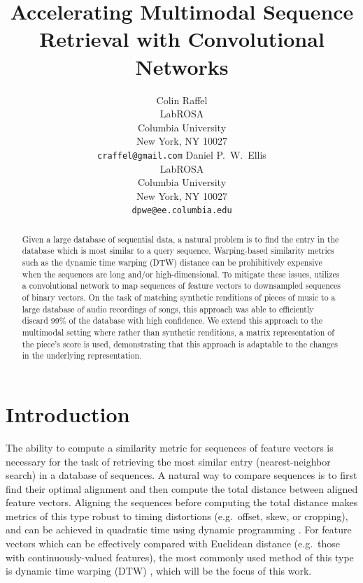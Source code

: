 \documentclass{article} %
\title{Accelerating Multimodal Sequence Retrieval with Convolutional Networks}
\author{
Colin Raffel\\
LabROSA\\
Columbia University\\
New York, NY 10027\\
\texttt{craffel@gmail.com}
\And
Daniel P.~W.~Ellis\\
LabROSA\\
Columbia University\\
New York, NY 10027\\
\texttt{dpwe@ee.columbia.edu}
}
\begin{document}
\maketitle

\begin{abstract}
Given a large database of sequential data, a natural problem is to find the entry in the database which is most similar to a query sequence.
Warping-based similarity metrics such as the dynamic time warping (DTW) distance can be prohibitively expensive when the sequences are long and/or high-dimensional.
To mitigate these issues, \cite{raffel2015large} utilizes a convolutional network to map sequences of feature vectors to downsampled sequences of binary vectors.
On the task of matching synthetic renditions of pieces of music to a large database of audio recordings of songs, this approach was able to efficiently discard 99\% of the database with high confidence.
We extend this approach to the multimodal setting where rather than synthetic renditions, a matrix representation of the piece's score is used, demonstrating that this approach is adaptable to the changes in the underlying representation.
\end{abstract}

\section{Introduction}
\label{sec:intro}

The ability to compute a similarity metric for sequences of feature vectors is necessary for the task of retrieving the most similar entry (nearest-neighbor search) in a database of sequences.
A natural way to compare sequences is to first find their optimal alignment and then compute the total distance between aligned feature vectors.
Aligning the sequences before computing the total distance makes metrics of this type robust to timing distortions (e.g.\ offset, skew, or cropping), and can be achieved in quadratic time using dynamic programming \cite{rakthanmanon2012searching}.
For feature vectors which can be effectively compared with Euclidean distance (e.g.\ those with continuously-valued features), the most commonly used method of this type is dynamic time warping (DTW) \cite{sakoe1978dynamic}, which will be the focus of this work.
\end{document}
